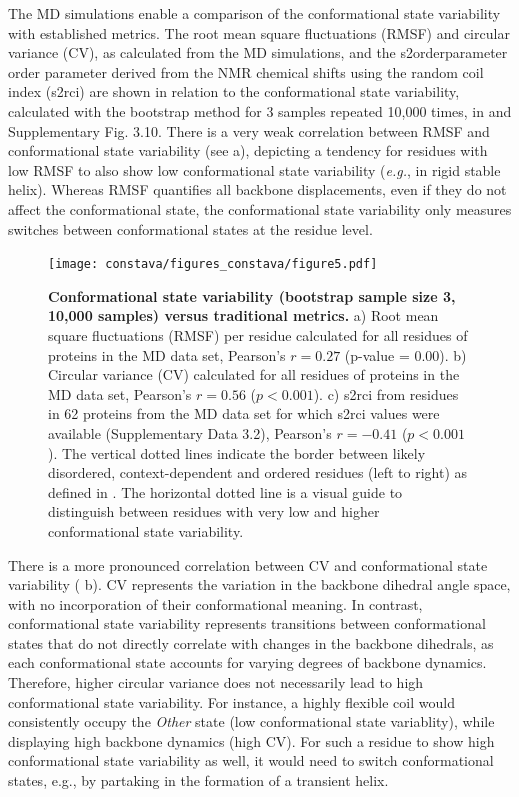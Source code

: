 The MD simulations enable a comparison of the conformational state variability with established metrics. The root mean square fluctuations (RMSF) and circular variance (CV), as calculated from the MD simulations, and the \gls{s2orderparameter} order parameter derived from the NMR chemical shifts using the random coil index (\gls{s2rci}) are shown in relation to the conformational state variability, calculated with the bootstrap method for 3 samples repeated 10,000 times, in  and Supplementary Fig. 3.10.
There is a very weak correlation between RMSF and conformational state variability (see  a), depicting a tendency for residues with low RMSF to also show low conformational state variability (\textit{e.g.}, in rigid stable helix). Whereas RMSF quantifies all backbone displacements, even if they do not affect the conformational state, the conformational state variability only measures switches between conformational states at the residue level. 

\begin{figure}[!t]
\texttt{[image: constava/figures\_constava/figure5.pdf]}
\caption{
    \textbf{Conformational state variability (bootstrap sample size 3, 10,000 samples) versus traditional metrics.} 
    a) Root mean square fluctuations (RMSF) per residue calculated for all residues of proteins in the MD data set, Pearson's $r = 0.27 $ (p-value = 0.00).
    b) Circular variance (CV) calculated for all residues of proteins in the MD data set, Pearson's $r = 0.56$ ($p < 0.001$).
    c) \gls{s2rci} from residues in 62 proteins from the MD data set for which \gls{s2rci} values were available (Supplementary Data 3.2),
    Pearson's $r = -0.41$ ($p < 0.001$). The vertical dotted lines indicate the border between likely disordered, context-dependent and ordered residues (left to right) as defined in \cite{cilia_protein_2013}. The horizontal dotted line is a visual guide to distinguish between residues with very low and higher conformational state variability.
}
\label{fig:metrics_vs_confstatevar}
\end{figure}


There is a more pronounced correlation between CV and conformational state variability ( b). CV represents the variation in the  backbone dihedral angle space, with no incorporation of their conformational meaning. In contrast, conformational state variability represents transitions between conformational states that do not directly correlate with changes in the backbone dihedrals, as each conformational state accounts for varying degrees of backbone dynamics. Therefore, higher circular variance does not necessarily lead to high conformational state variability. For instance, a highly flexible coil would consistently occupy the \textit{Other} state (low conformational state variablity), while displaying high backbone dynamics (high CV). For such a residue to show high conformational state variability as well, it would need to switch conformational states, e.g., by partaking in the formation of a transient helix.


